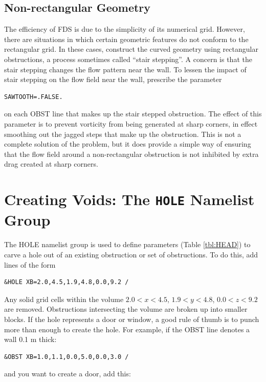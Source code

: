 \documentclass[11pt]{book}
\begin{document}
\subsection{Non-rectangular Geometry}%

The efficiency of FDS is due to the simplicity of its numerical grid.
However, there are situations in which certain geometric features do
not conform to the rectangular grid. In these cases,
construct the curved geometry using rectangular obstructions, a process
sometimes called ``stair stepping''. A concern is that
the stair stepping changes the flow pattern near the wall. To lessen
the impact of stair stepping on the flow field near the wall,
prescribe the parameter

\footnotesize
\begin{verbatim}
SAWTOOTH=.FALSE.
\end{verbatim}
\normalsize
on each {\ct OBST} line that makes up the stair stepped obstruction.
The effect of this parameter is to prevent vorticity from being generated
at sharp corners, in effect smoothing out the jagged steps that make up
the obstruction. This is not a complete solution of the problem, but it
does provide a simple way of ensuring that the flow field around a
non-rectangular obstruction is not inhibited by extra drag created at
sharp corners.

\section{Creating Voids: The \texorpdfstring{{\tt HOLE}}{HOLE} Namelist Group}%
\label{info:HOLE}

The {\ct HOLE} namelist group is used to define parameters (Table \ref{tbl:HEAD}) to carve a hole
out of an existing obstruction or set of obstructions. To do this, add lines of the form

\footnotesize
\begin{verbatim}
&HOLE XB=2.0,4.5,1.9,4.8,0.0,9.2 /
\end{verbatim}
\normalsize
Any solid grid cells within the volume $2.0<x<4.5$, $1.9<y<4.8$,
$0.0<z<9.2$ are removed. Obstructions intersecting the volume are
broken up into smaller blocks. If the hole represents a door or window, a
good rule of thumb is to punch more than enough to create the hole. For
example, if the {\ct OBST} line denotes a wall 0.1 m thick:

\footnotesize
\begin{verbatim}
&OBST XB=1.0,1.1,0.0,5.0,0.0,3.0 /
\end{verbatim}
\normalsize
and you want to create a door, add this:
\end{document}
